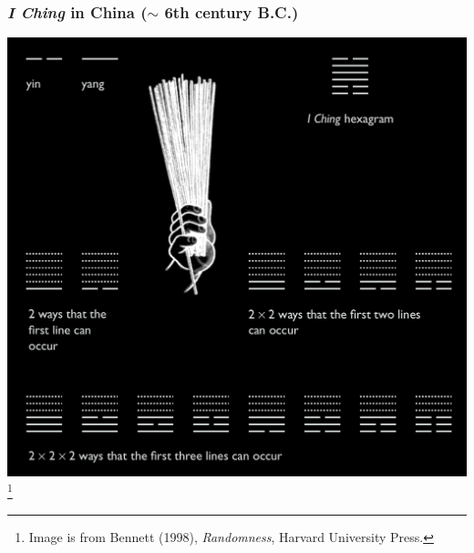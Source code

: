 \documentclass[9pt]{beamer}
\begin{document}
\begin{frame}[fragile] %
  \frametitle{{\it I Ching} in China ($\sim$ 6th century B.C.)}
 \begin{center}
   \includegraphics[scale=0.15]{./figs/IChing-neg.png}
   \footnote{Image is from Bennett (1998), {\it Randomness}, Harvard University Press.}
 \end{center}
\end{frame}
\end{document}
